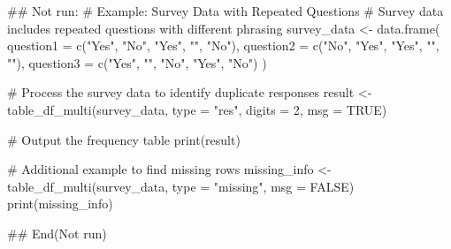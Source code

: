 \documentclass[a4paper]{book}
\begin{document}
%
\begin{Examples}
\begin{ExampleCode}
\#\# Not run: 
# Example: Survey Data with Repeated Questions
# Survey data includes repeated questions with different phrasing
survey_data <- data.frame(
  question1 = c("Yes", "No", "Yes", "", "No"),
  question2 = c("No", "Yes", "Yes", "", ""),
  question3 = c("Yes", "", "No", "Yes", "No")
)

# Process the survey data to identify duplicate responses
result <- table_df_multi(survey_data, type = "res", digits = 2, msg = TRUE)

# Output the frequency table
print(result)

# Additional example to find missing rows
missing_info <- table_df_multi(survey_data, type = "missing", msg = FALSE)
print(missing_info)

## End(Not run)
\end{ExampleCode}
\end{Examples}
\end{document}
